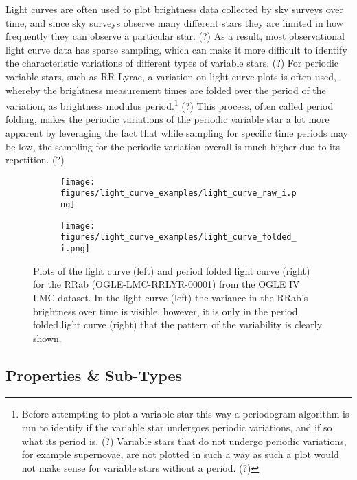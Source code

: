 \documentclass[]{article}
\begin{document}
Light curves are often used to plot brightness data collected by sky surveys over time, and since sky surveys observe many different stars they are limited in how frequently they can observe a particular star. (?) As a result, most observational light curve data has sparse sampling, which can make it more difficult to identify the characteristic variations of different types of variable stars. (?) For periodic variable stars, such as RR Lyrae, a variation on light curve plots is often used, whereby the brightness measurement times are folded over the period of the variation, as brightness modulus period.\footnote{Before attempting to plot a variable star this way a periodogram algorithm is run to identify if the variable star undergoes periodic variations, and if so what its period is. (?) Variable stars that do not undergo periodic variations, for example supernovae, are not plotted in such a way as such a plot would not make sense for variable stars without a period. (?)} (?) This process, often called period folding, makes the periodic variations of the periodic variable star a lot more apparent by leveraging the fact that while sampling for specific time periods may be low, the sampling for the periodic variation overall is much higher due to its repetition. (?)

\begin{figure}
	\centering
	\begin{subfigure}{.5\textwidth}
		\centering
		\texttt{[image: figures/light\_curve\_examples/light\_curve\_raw\_i.png]}
		\label{fig:light_curve_raw_i}
	\end{subfigure}%
	\begin{subfigure}{.5\textwidth}
		\centering
		\texttt{[image: figures/light\_curve\_examples/light\_curve\_folded\_i.png]}
		\label{fig:sub2}
	\end{subfigure}
	\caption{Plots of the light curve (left) and period folded light curve (right) for the RRab (OGLE-LMC-RRLYR-00001) from the OGLE IV LMC dataset. In the light curve (left) the variance in the RRab’s brightness over time is visible, however, it is only in the period folded light curve (right) that the pattern of the variability is clearly shown.}
	\label{fig:light_curves}
\end{figure}

\subsection{Properties \& Sub-Types}
\end{document}
